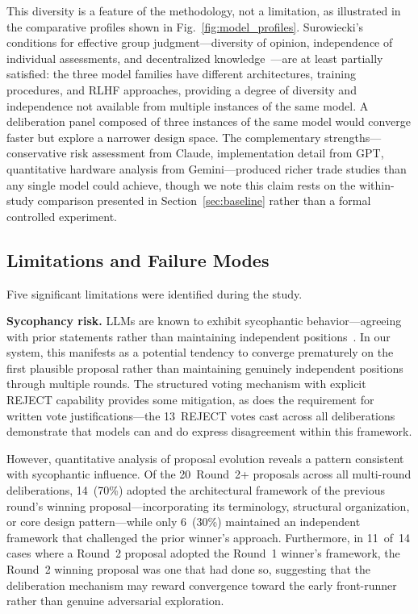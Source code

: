 \documentclass[11pt,a4paper]{article}
\begin{document}
This diversity is a feature of the methodology, not a limitation, as illustrated in the comparative profiles shown in Fig.~\ref{fig:model_profiles}. Surowiecki's conditions for effective group judgment---diversity of opinion, independence of individual assessments, and decentralized knowledge~\cite{surowiecki2004wisdom}---are at least partially satisfied: the three model families have different architectures, training procedures, and RLHF approaches, providing a degree of diversity and independence not available from multiple instances of the same model. A deliberation panel composed of three instances of the same model would converge faster but explore a narrower design space. The complementary strengths---conservative risk assessment from Claude, implementation detail from GPT, quantitative hardware analysis from Gemini---produced richer trade studies than any single model could achieve, though we note this claim rests on the within-study comparison presented in Section~\ref{sec:baseline} rather than a formal controlled experiment.

\subsection{Limitations and Failure Modes}
\label{sec:limitations}

Five significant limitations were identified during the study.

\textbf{Sycophancy risk.} LLMs are known to exhibit sycophantic behavior---agreeing with prior statements rather than maintaining independent positions~\cite{perez2022sycophancy}. In our system, this manifests as a potential tendency to converge prematurely on the first plausible proposal rather than maintaining genuinely independent positions through multiple rounds. The structured voting mechanism with explicit REJECT capability provides some mitigation, as does the requirement for written vote justifications---the 13~REJECT votes cast across all deliberations demonstrate that models can and do express disagreement within this framework.

However, quantitative analysis of proposal evolution reveals a pattern consistent with sycophantic influence. Of the 20~Round~2+ proposals across all multi-round deliberations, 14~(70\%) adopted the architectural framework of the previous round's winning proposal---incorporating its terminology, structural organization, or core design pattern---while only 6~(30\%) maintained an independent framework that challenged the prior winner's approach. Furthermore, in 11~of~14 cases where a Round~2 proposal adopted the Round~1 winner's framework, the Round~2 winning proposal was one that had done so, suggesting that the deliberation mechanism may reward convergence toward the early front-runner rather than genuine adversarial exploration.
\end{document}
